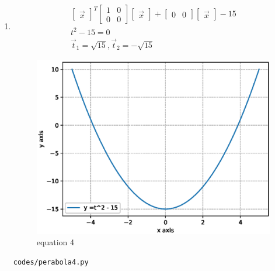 \begin{enumerate}[label=\arabic*.,ref=\thesubsection.\theenumi]
	\item
\begin{align}
\begin{bmatrix}\vec x\end{bmatrix}^T\begin{bmatrix}1 & 0\\0 & 0\end{bmatrix}\begin{bmatrix}\vec x\end{bmatrix} + \begin{bmatrix}0 & 0\end{bmatrix}\begin{bmatrix}\vec x\end{bmatrix} -15
\\
t^2 - 15 = 0
\\
\vec t_1 = \sqrt {15} ,\vec t_2 =-\sqrt {15} 
\end{align}
\begin{figure}[!ht]
	\centering
	\includegraphics[width=\columnwidth]{./figures/perabola4.eps}
	\caption{equation 4 }
	\label{fig:perabola4}
\end{figure}
\begin{lstlisting}
codes/perabola4.py
\end{lstlisting}




\end{enumerate}
